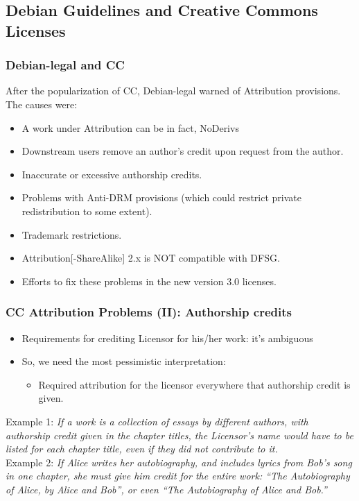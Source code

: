 \documentclass{beamer}
\begin{document}

\subsection{Debian Guidelines and Creative Commons Licenses}


\begin{frame}
\frametitle{Debian-legal and CC}

After the popularization of CC, Debian-legal warned of
Attribution provisions. The causes were:

\begin{itemize}
\item A work under Attribution can be in fact, NoDerivs 
\item Downstream users remove an author's credit upon request from the author.
\item Inaccurate or excessive authorship credits.
\item Problems with Anti-DRM provisions (which could restrict private redistribution to some extent).
\item Trademark restrictions.
\item Attribution[-ShareAlike] 2.x is NOT compatible with DFSG. 
\item Efforts to fix these problems in the new version 3.0 licenses.

\end{itemize}


\end{frame}



\begin{frame}
\frametitle{CC Attribution Problems (II): Authorship credits}

\begin{itemize}
\item Requirements for crediting Licensor for his/her work: it's ambiguous
\item So, we need the most pessimistic interpretation:
\begin{itemize}
\item Required attribution for the licensor everywhere that authorship credit is given.
\end{itemize}
\end{itemize}
Example 1: {\it If a work is a collection of essays by different authors, with authorship credit given in the chapter titles, the Licensor's name would have to be listed for each chapter title, even if they did not contribute to it.}\\
Example 2: {\it If Alice writes her autobiography, and includes lyrics from Bob's song in one chapter, she must give him credit for the entire work: ``The Autobiography of Alice, by Alice and Bob'', or even ``The Autobiography of Alice and Bob.''}
\end{frame}
\end{document}
